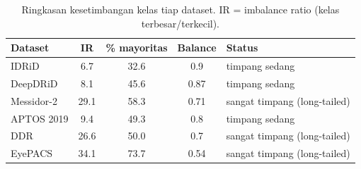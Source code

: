 \begin{table}[htbp]
\caption{Ringkasan kesetimbangan kelas tiap dataset. IR = imbalance ratio (kelas terbesar/terkecil).}
\label{tab:kesetimbangan}
\begin{center}
\small
\renewcommand{\arraystretch}{1.3}
\begin{tabular}{|l|c|c|c|p{3.2cm}|}
\hline
\textbf{Dataset} & \textbf{IR} & \textbf{\% mayoritas} & \textbf{Balance} & \textbf{Status} \\
\hline
IDRiD & 6.7 & 32.6 & 0.9 & timpang sedang \\
\hline
DeepDRiD & 8.1 & 45.6 & 0.87 & timpang sedang \\
\hline
Messidor-2 & 29.1 & 58.3 & 0.71 & sangat timpang (long-tailed) \\
\hline
APTOS 2019 & 9.4 & 49.3 & 0.8 & timpang sedang \\
\hline
DDR & 26.6 & 50.0 & 0.7 & sangat timpang (long-tailed) \\
\hline
EyePACS & 34.1 & 73.7 & 0.54 & sangat timpang (long-tailed) \\
\hline
\end{tabular}
\end{center}\end{table}
